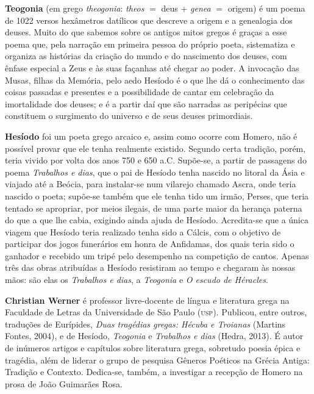\textbf{Teogonia} (em grego \textit{theogonia}: \textit{theos} $=$ deus +
\textit{genea} $=$ origem) é um poema de 1022 versos hexâmetros datílicos que
descreve a origem e a genealogia dos deuses. Muito do que sabemos sobre os
antigos mitos gregos é graças a esse poema que, pela narração em primeira
pessoa do próprio poeta, sistematiza e organiza as histórias da criação do
mundo e do nascimento dos deuses, com ênfase especial a Zeus e às suas façanhas até chegar ao poder. A invocação das Musas, filhas da Memória, pelo aedo Hesíodo é o que lhe dá o conhecimento das coisas passadas e presentes e a possibilidade de cantar em celebração da imortalidade dos deuses; e é a partir daí que são narradas as peripécias que constituem o surgimento do universo e de seus deuses primordiais.  

\textbf{Hesíodo} foi um poeta grego arcaico e, assim como ocorre com Homero, não é possível provar que ele tenha realmente existido. Segundo certa tradição, porém, teria vivido por volta dos anos 750 e 650 a.C.  Supõe-se, a partir de passagens do poema \textit{Trabalhos e dias}, que o pai de Hesíodo tenha nascido no litoral da Ásia e viajado até a Beócia, para instalar-se num vilarejo chamado Ascra, onde teria nascido o poeta; supõe-se também que ele tenha tido um irmão, Perses, que teria tentado se apropriar, por meios ilegais, de uma parte maior da herança paterna do que a que lhe cabia, exigindo ainda ajuda de Hesíodo. Acredita-se que a única viagem que Hesíodo teria realizado tenha sido a Cálcis, com o objetivo de participar dos jogos funerários em honra de Anfidamas, dos quais teria sido o ganhador e recebido um tripé pelo desempenho na competição de cantos. Apenas três das obras atribuídas a Hesíodo resistiram ao tempo e chegaram às nossas mãos: são elas os \textit{Trabalhos e dias}, a \textit{Teogonia} e \textit{O escudo de Héracles}.


\textbf{Christian Werner} é professor livre-docente de língua e literatura grega na Faculdade de Letras da Universidade de São Paulo (\textsc{usp}). Publicou, entre outros, traduções de Eurípides, \textit{Duas tragédias gregas: Hécuba e Troianas} (Martins Fontes, 2004), e de Hesíodo, \textit{Teogonia} e \textit{Trabalhos e dias} (Hedra, 2013). É autor de inúmeros artigos e capítulos sobre literatura grega, sobretudo poesia épica e tragédia, além de liderar o grupo de pesquisa Gêneros Poéticos na Grécia Antiga: Tradição e Contexto. Dedica-se, também, a investigar a recepção de Homero na prosa de João Guimarães Rosa.